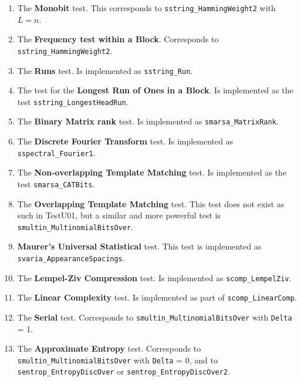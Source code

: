 \begin{enumerate}
\item The {\bf Monobit} test. This corresponds to
 {\tt sstring\_HammingWeight2} with $L = n$.

\item The {\bf Frequency test within a  Block}. Corresponds to
 {\tt sstring\_HammingWeight2}.

\item The {\bf Runs} test.   Is implemented as {\tt sstring\_Run}.

\item The test for the {\bf Longest Run of Ones in a Block}. 
 Is implemented as the test
 {\tt sstring\_LongestHeadRun}.

\item The {\bf Binary Matrix rank} test.  Is implemented as
 {\tt smarsa\_MatrixRank}.

\item The {\bf Discrete Fourier Transform} test.  Is implemented as
 {\tt sspectral\_Fourier1}.

\item The {\bf Non-overlapping Template Matching} test. Is implemented
  as the test {\tt smarsa\_CATBits}. 

\item The {\bf Overlapping Template Matching} test. This test does not
exist as such in TestU01, but a similar and more powerful test is
{\tt smultin\_MultinomialBitsOver}.

\item {\bf Maurer's Universal Statistical} test. This test is implemented as
 {\tt svaria\_Appear\-anceSpacings}. 

\item The {\bf Lempel-Ziv Compression} test.  Is implemented as
 {\tt scomp\_LempelZiv}.

\item The {\bf Linear Complexity} test. Is implemented as part of
 {\tt scomp\_LinearComp}.

\item The {\bf Serial} test.  Corresponds to
 {\tt smultin\_MultinomialBitsOver} with  {\tt Delta} = 1.

\item The {\bf Approximate Entropy} test.  Corresponds to
 {\tt smultin\_MultinomialBitsOver} with  {\tt Delta} = 0, and to
 {\tt sentrop\_EntropyDiscOver} or  {\tt sentrop\_EntropyDiscOver2}.


\end{enumerate}
